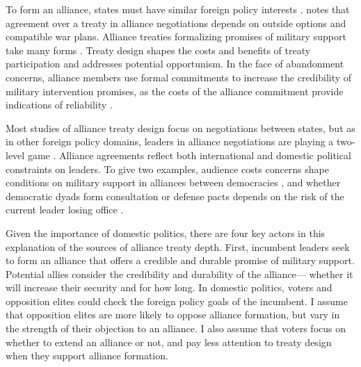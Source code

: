 \documentclass[12pt]{article}
\begin{document}
To form an alliance, states must have similar foreign policy interests \citep{Morrow1991, Smith1995, FordhamPoast2014}. 
\citet{Poast2019a} notes that agreement over a treaty in alliance negotiations depends on outside options and compatible war plans. 
Alliance treaties formalizing promises of military support take many forms \citep{Leedsetal2002, BensonClinton2016}. 
Treaty design shapes the costs and benefits of treaty participation and addresses potential opportunism.  
In the face of abandonment concerns, alliance members use formal commitments to increase the credibility of military intervention promises, as the costs of the alliance commitment provide indications of reliability \citep{Morrow2000}.


Most studies of alliance treaty design focus on negotiations between states, but as in other foreign policy domains, leaders in alliance negotiations are playing a two-level game \citep{Putnam1988}. 
Alliance agreements reflect both international and domestic political constraints on leaders. 
To give two examples, audience costs concerns shape conditions on military support in alliances between democracies \citep{Chibaetal2015, FjelstulReiter2019}, and whether democratic dyads form consultation or defense pacts depends on the risk of the current leader losing office \citep{Mattes2012a}. 


Given the importance of domestic politics, there are four key actors in this explanation of the sources of alliance treaty depth. 
First, incumbent leaders seek to form an alliance that offers a credible and durable promise of military support. 
Potential allies consider the credibility and durability of the alliance--- whether it will increase their security and for how long. 
In domestic politics, voters and opposition elites could check the foreign policy goals of the incumbent. 
I assume that opposition elites are more likely to oppose alliance formation, but vary in the strength of their objection to an alliance. 
I also assume that voters focus on whether to extend an alliance or not, and pay less attention to treaty design when they support alliance formation.
\end{document}
